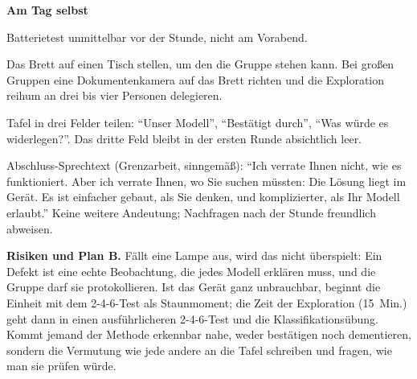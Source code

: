 \begin{vorbereitung}
\textbf{Am Tag selbst}
\begin{checkliste}
  \item Batterietest unmittelbar vor der Stunde, nicht am Vorabend.
  \item Das Brett auf einen Tisch stellen, um den die Gruppe stehen
    kann. Bei großen Gruppen eine Dokumentenkamera auf das Brett richten
    und die Exploration reihum an drei bis vier Personen delegieren.
  \item Tafel in drei Felder teilen: \enquote{Unser Modell},
    \enquote{Bestätigt durch}, \enquote{Was würde es widerlegen?}. Das
    dritte Feld bleibt in der ersten Runde absichtlich leer.
  \item Abschluss-Sprechtext (Grenzarbeit, sinngemäß): \enquote{Ich
    verrate Ihnen nicht, wie es funktioniert. Aber ich verrate Ihnen,
    wo Sie suchen müssten: Die Lösung liegt im Gerät. Es ist einfacher
    gebaut, als Sie denken, und komplizierter, als Ihr Modell erlaubt.}
    Keine weitere Andeutung; Nachfragen nach der Stunde freundlich
    abweisen.
\end{checkliste}

\textbf{Risiken und Plan B.} Fällt eine Lampe aus, wird das nicht
überspielt: Ein Defekt ist eine echte Beobachtung, die jedes Modell
erklären muss, und die Gruppe darf sie protokollieren. Ist das Gerät
ganz unbrauchbar, beginnt die Einheit mit dem 2-4-6-Test als
Staunmoment; die Zeit der Exploration (15~Min.) geht dann in einen
ausführlicheren 2-4-6-Test und die Klassifikationsübung. Kommt jemand der
Methode erkennbar nahe, weder bestätigen noch dementieren, sondern die
Vermutung wie jede andere an die Tafel schreiben und fragen, wie man sie
prüfen würde.
\end{vorbereitung}

